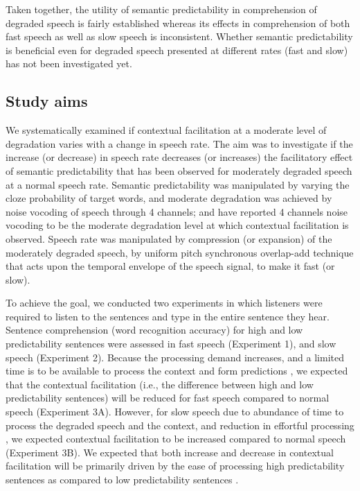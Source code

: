 \documentclass[a4paper, nobind]{templates/ociamthesis}
\begin{document}
Taken together, the utility of semantic predictability in comprehension of degraded speech is fairly established whereas its effects in comprehension of both fast speech as well as slow speech is inconsistent.
Whether semantic predictability is beneficial even for degraded speech presented at different rates (fast and slow) has not been investigated yet.

\hypertarget{study-aims}{%
\subsection{Study aims}\label{study-aims}}

We systematically examined if contextual facilitation at a moderate level of degradation varies with a change in speech rate.
The aim was to investigate if the increase (or decrease) in speech rate decreases (or increases) the facilitatory effect of semantic predictability that has been observed for moderately degraded speech at a normal speech rate.
Semantic predictability was manipulated by varying the cloze probability of target words, and moderate degradation was achieved by noise vocoding of speech through 4 channels;
\textcite{Obleser2010} and \textcite{Bhandari2021} have reported 4 channels noise vocoding to be the moderate degradation level at which contextual facilitation is observed.
Speech rate was manipulated by compression (or expansion) of the moderately degraded speech, by uniform pitch synchronous overlap-add technique that acts upon the temporal envelope of the speech signal, to make it fast (or slow).

To achieve the goal, we conducted two experiments in which listeners were required to listen to the sentences and type in the entire sentence they hear.
Sentence comprehension (word recognition accuracy) for high and low predictability sentences were assessed in fast speech (Experiment 1), and slow speech (Experiment 2).
Because the processing demand increases, and a limited time is to be available to process the context and form predictions \autocites[e.g.,][]{Aydelott2004,Wlotko2015}, we expected that the contextual facilitation (i.e., the difference between high and low predictability sentences) will be reduced for fast speech compared to normal speech (Experiment 3A).
However, for slow speech due to abundance of time to process the degraded speech and the context, and reduction in effortful processing \autocite[e.g.,][]{Winn2021b}, we expected contextual facilitation to be increased compared to normal speech (Experiment 3B).
We expected that both increase and decrease in contextual facilitation will be primarily driven by the ease of processing high predictability sentences as compared to low predictability sentences \autocite{Aydelott2004,Goy2013}.
\end{document}

